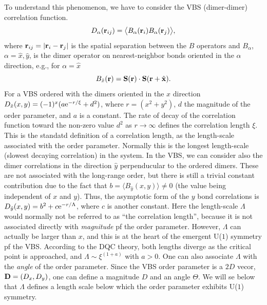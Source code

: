 \documentclass[range]{ar2e}
\begin{document}
To understand this phenomenon, we have to consider the VBS (dimer-dimer) correlation function.
\begin{equation}
D_{\alpha} ({\bf r}_{ij}) = \bigl \langle B_\alpha({\bf r}_i)B_\alpha({\bf r}_j) \bigr \rangle, \label{cddef}
\end{equation}
where ${\bf r}_{ij}=|{\bf r}_{i}-{\bf r}_{j}|$ is the spatial separation between the $B$ operators and $B_\alpha$, $\alpha=\hat x,\hat y$,
is the dimer operator on nearest-neighbor bonds oriented in the $\alpha$ direction, e.g., for $\alpha=\hat x$
\begin{equation}
B_{\hat x}({\bf r})={\bf S}({\bf r}) \cdot {\bf S}({\bf r}+\hat {\bf x}).
\label{bxdef}
\end{equation}
For a VBS ordered with the dimers oriented in the $x$ direction $D_{\hat x}(x,y) = (-1)^{x}(a{\rm e}^{-r/\xi}+d^2)$, where $r=(x^2+y^2)$, $d$ the magnitude 
of the order parameter, and $a$ is a constant. The rate of decay of the correlation function toward the non-zero value $d^2$ as $r\to \infty$ defines
the correlation length $\xi$. This is the standatd definition of a correlation length, as the length-scale associated with the order parameter. Normally
this is the longest length-scale (slowest decaying correlation) in the system. In the VBS, we can consider also the dimer correlations in the direction
$\hat y$ perpenducular to the ordered dimers. These are not associated with the long-range order, but there is still a trivial constant contribution due to the
fact that $b=\langle B_{\hat y}(x,y)\rangle \not = 0$ (the value being independent of $x$ and $y$). Thus, the asymptotic form of the $y$ bond correlations is
$D_{\hat y}(x,y) = b^2 + c{\rm e}^{-r/\Lambda}$, where $c$ is another constant. Here the length-scale $\Lambda$ would normally not be referred to as 
``the correlation length'', because it is not associated directly with {\it magnitude} pf the order parameter. However, $\Lambda$ can actually be larger than $x$, 
and this is at the heart of the emergent U($1$) symmetry pf the VBS. According to the DQC theory, both lengths diverge as the critical point is approached, and 
$\Lambda \sim \xi^(1+a)$ with $a>0$. One can also associate $\Lambda$ with the {\it angle} of the order parameter. Since the VBS order parameter is a $2D$
vecor, ${\bf D}= (D_x,D_y)$, one can define a magnitude $D$ and an angle $\Theta$. We will se below that $\Lambda$ defines a length scale below which the
order parameter exhibits U($1$) symmetry.
\end{document}

